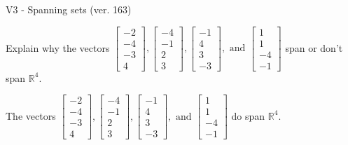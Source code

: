 \begin{exercise}
  \begin{exerciseTitle}V3 - Spanning sets (ver. 163)\end{exerciseTitle}
  \begin{exerciseStatement}
    Explain why the vectors \(\left[\begin{array}{r}
-2 \\
-4 \\
-3 \\
4
\end{array}\right] , \left[\begin{array}{r}
-4 \\
-1 \\
2 \\
3
\end{array}\right] , \left[\begin{array}{r}
-1 \\
4 \\
3 \\
-3
\end{array}\right] , \text{ and } \left[\begin{array}{r}
1 \\
1 \\
-4 \\
-1
\end{array}\right]\) span or don't span \(\mathbb{R}^4\). 
	


  \end{exerciseStatement}
  \begin{exerciseAnswer}
   The vectors \(\left[\begin{array}{r}
-2 \\
-4 \\
-3 \\
4
\end{array}\right] , \left[\begin{array}{r}
-4 \\
-1 \\
2 \\
3
\end{array}\right] , \left[\begin{array}{r}
-1 \\
4 \\
3 \\
-3
\end{array}\right] , \text{ and } \left[\begin{array}{r}
1 \\
1 \\
-4 \\
-1
\end{array}\right]\) 
  	 do  
	span \(\mathbb{R}^4\).
  


  \end{exerciseAnswer}
\end{exercise}
